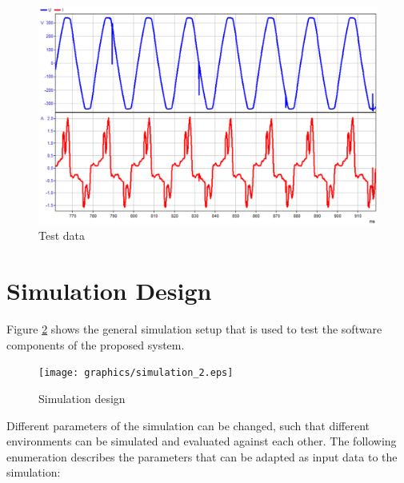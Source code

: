 \begin{figure}[h]
	\centering
		\includegraphics[scale=0.5]{graphics/testdata.eps}
	\caption{Test data}
	\label{fig:test_data}
\end{figure}

\section{Simulation Design}

Figure \ref{fig:simulation_design} shows the general simulation setup that is used to test the software components of the proposed system.

\begin{figure}[h]
	\centering
		\texttt{[image: graphics/simulation\_2.eps]}
	\caption{Simulation design}
	\label{fig:simulation_design}
\end{figure}

Different parameters of the simulation can be changed, such that different environments can be simulated and evaluated against each other. The following enumeration describes the parameters that can be adapted as input data to the simulation:


